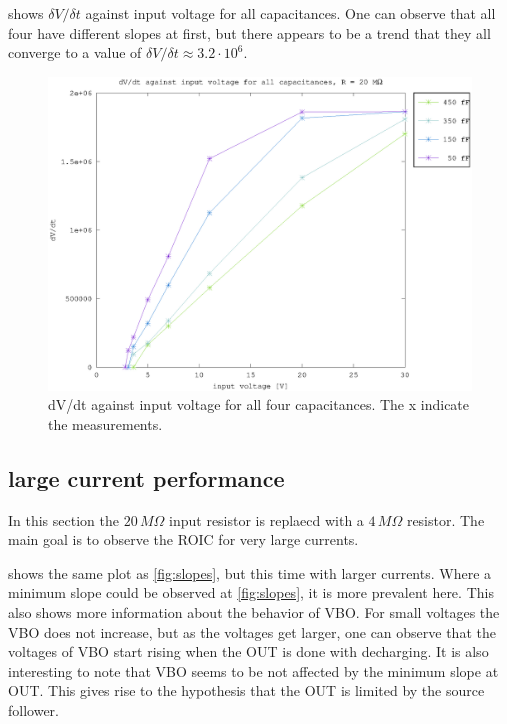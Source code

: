\documentclass{article}
\begin{document}
 shows $\delta V / \delta t$ against input voltage for all capacitances. One can observe that all four have different slopes at first, but there appears to be a trend that they all converge to a value of $\delta V/\delta t \approx 3.2\cdot10^6$.


\begin{figure}[h]
	    \centering
	    \includegraphics[width=\textwidth]{fig/vin_vs_time_sat.eps}
	    \caption[]%
	    {dV/dt against input voltage for all four capacitances. The x indicate the measurements.}    
	    \label{fig:e_vs_m}	
\end{figure}



\clearpage
\subsection{large current performance}
In this section the $20\,M\Omega$ input resistor is replaecd with a $4\,M\Omega$ resistor. The main goal is to observe the ROIC for very large currents.


 shows the same plot as \cref{fig:slopes}, but this time with larger currents. Where a minimum slope could be observed at \cref{fig:slopes}, it is more prevalent here. This also shows more information about the behavior of VBO. For small voltages the VBO does not increase, but as the voltages get larger, one can observe that the voltages of VBO start rising when the OUT is done with decharging. It is also interesting to note that VBO seems to be not affected by the minimum slope at OUT. This gives rise to the hypothesis that the OUT is limited by the source follower. 
\end{document}
